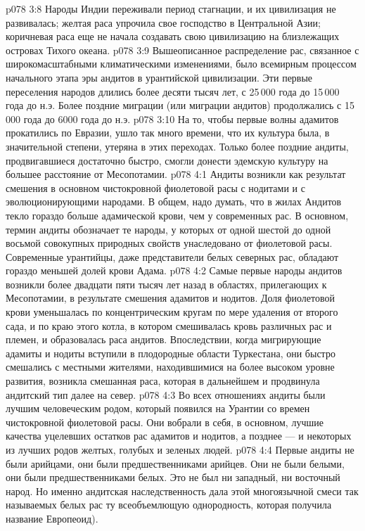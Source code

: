 \vs p078 3:8 Народы Индии переживали период стагнации, и их цивилизация не развивалась; желтая раса упрочила свое господство в Центральной Азии; коричневая раса еще не начала создавать свою цивилизацию на близлежащих островах Тихого океана.
\vs p078 3:9 \pc Вышеописанное распределение рас, связанное с широкомасштабными климатическими изменениями, было всемирным процессом начального этапа эры андитов в урантийской цивилизации. Эти первые переселения народов длились более десяти тысяч лет, с 25\,000 года до 15\,000 года до н.э. Более поздние миграции (или миграции андитов) продолжались с 15\,000 года до 6000 года до н.э.
\vs p078 3:10 На то, чтобы первые волны адамитов прокатились по Евразии, ушло так много времени, что их культура была, в значительной степени, утеряна в этих переходах. Только более поздние андиты, продвигавшиеся достаточно быстро, смогли донести эдемскую культуру на большее расстояние от Месопотамии.
\vs p078 4:1 Андиты возникли как результат смешения в основном чистокровной фиолетовой расы с нодитами и с эволюционирующими народами. В общем, надо думать, что в жилах Андитов текло гораздо больше адамической крови, чем у современных рас. В основном, термин андиты обозначает те народы, у которых от одной шестой до одной восьмой совокупных природных свойств унаследовано от фиолетовой расы. Современные урантийцы, даже представители белых северных рас, обладают гораздо меньшей долей крови Адама.
\vs p078 4:2 Самые первые народы андитов возникли более двадцати пяти тысяч лет назад в областях, прилегающих к Месопотамии, в результате смешения адамитов и нодитов. Доля фиолетовой крови уменьшалась по концентрическим кругам по мере удаления от второго сада, и по краю этого котла, в котором смешивалась кровь различных рас и племен, и образовалась раса андитов. Впоследствии, когда мигрирующие адамиты и нодиты вступили в плодородные области Туркестана, они быстро смешались с местными жителями, находившимися на более высоком уровне развития, возникла смешанная раса, которая в дальнейшем и продвинула андитский тип далее на север.
\vs p078 4:3 Во всех отношениях андиты были лучшим человеческим родом, который появился на Урантии со времен чистокровной фиолетовой расы. Они вобрали в себя, в основном, лучшие качества уцелевших остатков рас адамитов и нодитов, а позднее --- и некоторых из лучших родов желтых, голубых и зеленых людей.
\vs p078 4:4 \pc Первые андиты не были арийцами, они были предшественниками арийцев. Они не были белыми, они были предшественниками белых. Это не был ни западный, ни восточный народ. Но именно андитская наследственность дала этой многоязычной смеси так называемых белых рас ту всеобъемлющую однородность, которая получила название Европеоид).
